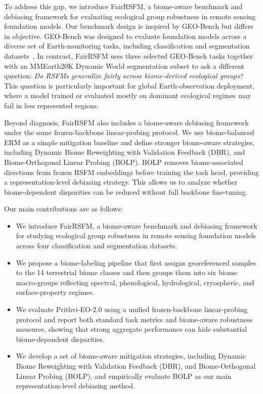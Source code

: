 \documentclass[10pt,twocolumn,letterpaper]{article}
\newcommand{\method}{FairRSFM\xspace}
\begin{document}
To address this gap, we introduce \method, a biome-aware benchmark and debiasing framework for evaluating ecological group robustness in remote sensing foundation models. Our benchmark design is inspired by GEO-Bench but differs in objective. GEO-Bench was designed to evaluate foundation models across a diverse set of Earth-monitoring tasks, including classification and segmentation datasets~\cite{geobench}. In contrast, \method uses three selected GEO-Bench tasks together with an MMEarth20K Dynamic World segmentation subset to ask a different question: \emph{Do RSFMs generalize fairly across biome-derived ecological groups?} This question is particularly important for global Earth-observation deployment, where a model trained or evaluated mostly on dominant ecological regimes may fail in less represented regions.

Beyond diagnosis, \method also includes a biome-aware debiasing framework under the same frozen-backbone linear-probing protocol. We use biome-balanced ERM as a simple mitigation baseline and define stronger biome-aware strategies, including  Dynamic Biome Reweighting with Validation Feedback (DBR), and Biome-Orthogonal Linear Probing (BOLP). BOLP removes biome-associated directions from frozen RSFM embeddings before training the task head, providing a representation-level debiasing strategy. This allows us to analyze whether biome-dependent disparities can be reduced without full backbone fine-tuning.

Our main contributions are as follows:
\begin{itemize}[leftmargin=*]
    \item We introduce \method, a biome-aware benchmark and debiasing framework for studying ecological group robustness in remote sensing foundation models across four classification and segmentation datasets.

    \item We propose a biome-labeling pipeline that first assigns georeferenced samples to the 14 terrestrial biome classes and then groups them into six biome macro-groups reflecting spectral, phenological, hydrological, cryospheric, and surface-property regimes.

    \item We evaluate Prithvi-EO-2.0 using a unified frozen-backbone linear-probing protocol and report both standard task metrics and biome-aware robustness measures, showing that strong aggregate performance can hide substantial biome-dependent disparities.
        
    \item We develop a set of biome-aware mitigation strategies, including Dynamic Biome Reweighting with Validation Feedback (DBR), and Biome-Orthogonal Linear Probing (BOLP), and empirically evaluate BOLP as our main representation-level debiasing method.
\end{itemize}
\end{document}
